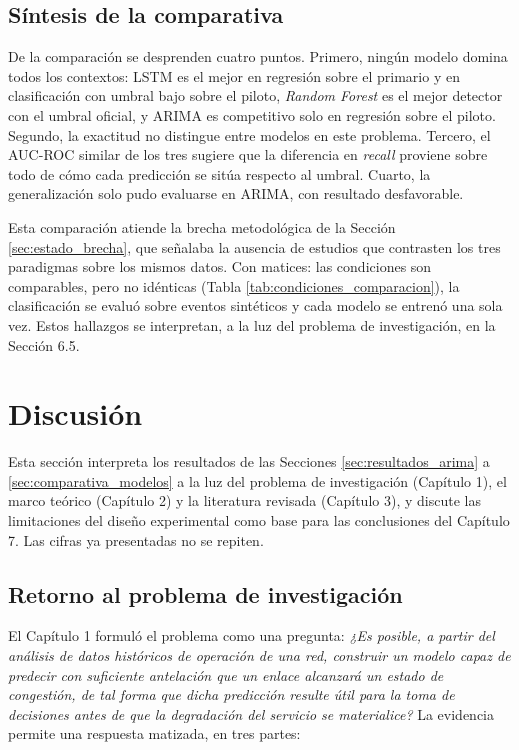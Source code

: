 \documentclass[12pt]{report}
\begin{document}
\subsection*{Síntesis de la comparativa}

De la comparación se desprenden cuatro puntos. Primero, ningún modelo domina todos los contextos: LSTM es el mejor en regresión sobre el primario y en clasificación con umbral bajo sobre el piloto, \textit{Random Forest} es el mejor detector con el umbral oficial, y ARIMA es competitivo solo en regresión sobre el piloto. Segundo, la exactitud no distingue entre modelos en este problema. Tercero, el AUC-ROC similar de los tres sugiere que la diferencia en \textit{recall} proviene sobre todo de cómo cada predicción se sitúa respecto al umbral. Cuarto, la generalización solo pudo evaluarse en ARIMA, con resultado desfavorable.

Esta comparación atiende la brecha metodológica de la Sección \ref{sec:estado_brecha}, que señalaba la ausencia de estudios que contrasten los tres paradigmas sobre los mismos datos. Con matices: las condiciones son comparables, pero no idénticas (Tabla \ref{tab:condiciones_comparacion}), la clasificación se evaluó sobre eventos sintéticos y cada modelo se entrenó una sola vez. Estos hallazgos se interpretan, a la luz del problema de investigación, en la Sección 6.5.

\section{Discusión}
\label{sec:discusion}

Esta sección interpreta los resultados de las Secciones \ref{sec:resultados_arima} a \ref{sec:comparativa_modelos} a la luz del problema de investigación (Capítulo 1), el marco teórico (Capítulo 2) y la literatura revisada (Capítulo 3), y discute las limitaciones del diseño experimental como base para las conclusiones del Capítulo 7. Las cifras ya presentadas no se repiten.

\subsection*{Retorno al problema de investigación}

El Capítulo 1 formuló el problema como una pregunta: \textit{¿Es posible, a partir del análisis de datos históricos de operación de una red, construir un modelo capaz de predecir con suficiente antelación que un enlace alcanzará un estado de congestión, de tal forma que dicha predicción resulte útil para la toma de decisiones antes de que la degradación del servicio se materialice?} La evidencia permite una respuesta matizada, en tres partes:
\end{document}
